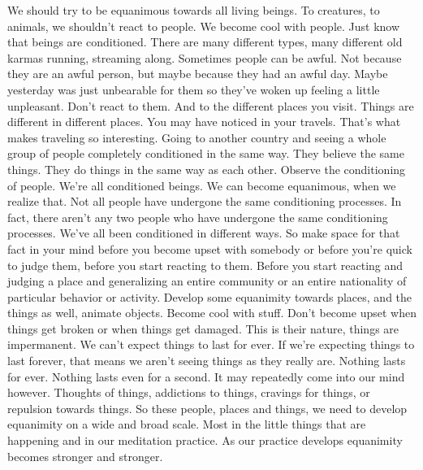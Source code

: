 \documentclass[letterpaper,10pt,english]{sphinxmanual}
\begin{document}
\sphinxAtStartPar
We  should  try  to  be  equanimous  towards  all  living  beings.  To  creatures, to animals, we shouldn’t react to people. We become cool with people.
Just know that beings are conditioned. There are many different types, many
different  old  karmas  running,  streaming  along.  Sometimes  people  can  be
awful. Not because they are an awful person, but maybe because they had an
awful day. Maybe yesterday was just unbearable for them so they’ve woken
up feeling a little unpleasant. Don’t react to them. And to the different places
you visit. Things are different in different places. You may have noticed in
your travels. That’s what makes traveling so interesting. Going to another
country and seeing a whole group of people completely conditioned in the
same way. They believe the same things. They do things in the same way
  as  each  other.  Observe  the  conditioning  of  people.  We’re  all  conditioned
beings. We can become equanimous, when we realize that. Not all people
have  undergone  the  same  conditioning  processes.  In  fact,  there  aren’t  any
two people who have undergone the same conditioning processes. We’ve all
been conditioned in different ways. So make space for that fact in your mind
before  you  become  upset  with  somebody  or  before  you’re  quick  to  judge
them, before you start reacting to them. Before you start reacting and judging a place and generalizing an entire community or an entire nationality of
particular  behavior  or  activity.  Develop  some  equanimity  towards  places,
and  the  things  as  well,  animate  objects.  Become  cool  with  stuff.  Don’t
become upset when things get broken or when things get damaged. This is
their nature, things are impermanent. We can’t expect things to last for ever.
If we’re expecting things to last forever, that means we aren’t seeing things
as they really are. Nothing lasts for ever. Nothing lasts even for a second. It
may repeatedly come into our mind however. Thoughts of things, addictions
to things, cravings for things, or repulsion towards things. So these people,
places and things, we need to develop equanimity on a wide and broad scale.
Most in the little things that are happening and in our meditation practice. As
our practice develops equanimity becomes stronger and stronger.
\end{document}
